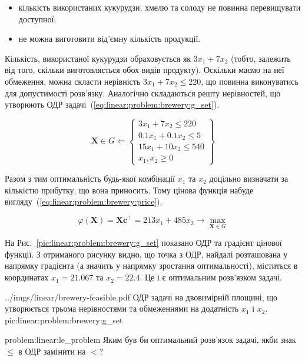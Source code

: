\documentclass[\main/book.tex]{subfiles}
\begin{document}
\begin{itemize}
 \item кількість використаних кукурудзи, хмелю та солоду не повинна перевищувати доступної;
 \item не можна виготовити від'ємну кількість продукції.
\end{itemize}

Кількість, використаної кукурудзи обраховується як ${3 x_1 + 7 x_2}$ (тобто, залежить від того, скільки виготовляється обох видів продукту). Оскільки маємо на неї обмеження, можна скласти нерівність ${3 x_1 + 7 x_2 \leq 220}$, що повинна виконуватись для допустимості розв'язку. Аналогічно складаються решту нерівностей, що утворюють ОДР задачі~(\ref{eq:linear:problem:brewery:g_set}).

\begin{equation}
 \mathbf{X} \in G \Leftarrow \left\{\begin{array}{l}
    3 x_1 + 7 x_2 \leq 220 \\
    0.1 x_1 + 0.1 x_2 \leq 5 \\
    15 x_1 + 10 x_2 \leq 540 \\
    x_1, x_2 \geq 0
 \end{array}\right\}
 \label{eq:linear:problem:brewery:g_set}
\end{equation}

Разом з тим оптимальність будь-якої комбінації $x_1$ та $x_2$ доцільно визначати за кількістю прибутку, що вона приносить. Тому цінова функція набуде вигляду~(\ref{eq:linear:problem:brewery:price}).

\begin{equation}
 \varphi(\mathbf{X}) =
 \mathbf{X} \mathbf{c}^\top =
 213 x_1 + 485 x_2
 \rightarrow \max_{\mathbf{X} \in G}
 \label{eq:linear:problem:brewery:price}
\end{equation}

На Рис.~\ref{pic:linear:problem:brewery:g_set} показано ОДР та градієнт цінової функції. З отриманого рисунку видно, що точка з ОДР, найдалі розташована у напрямку градієнта (а значить у напрямку зростання оптимальності), міститься в координатах $x_1 = 21.067$ та $x_2 = 22.4$. Це і є оптимальним розв'язком задачі.

\illustration
 {../imgs/linear/brewery-feasible.pdf}
 {ОДР задачі на двовимірній площині, що утворюється трьома нерівностями та обмеженнями на додатність $x_1$ і $x_2$.}
 {pic:linear:problem:brewery:g_set}
 
\begin{problem}{problem:linear:le_problem}
 Яким був би оптимальний розв'язок задачі, якби знак \flqq{}$\leq$\frqq{} в ОДР замінити на \flqq$<$\frqq?
\end{problem}
\end{document}
